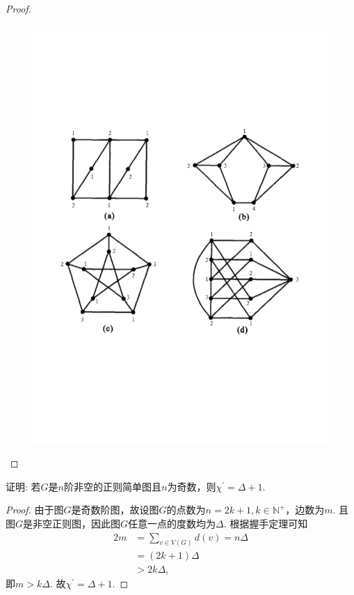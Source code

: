 \documentclass[cn,blue,normal,founder,11pt]{elegantnote}
\newcommand{\bbN}{\mathbb{N}}
\begin{document}
\begin{proof}
\begin{figure}[H]
	\caption{}
	\label{fig:7.1edge}
\end{figure}
\begin{figure}[H]
	\centering
	\includegraphics[scale=0.45]{image/ex7.1dot.pdf}
	\caption{}
	\label{fig:7.1dot}
\end{figure}
\end{proof}

\begin{example}
	证明: 若\(G\)是\(n\)阶非空的正则简单图且\(n\)为奇数，则\(\chi^{\prime}=\Delta+1\).
\end{example}

\begin{proof}
	由于图\(G\)是奇数阶图，故设图\(G\)的点数为\(n=2k+1,k\in\bbN^+\)，边数为\(m\). 且图\(G\)是非空正则图，因此图\(G\)任意一点的度数均为\(\Delta\). 根据握手定理可知
	\begin{align*}
		2m&=\sum_{v\in V(G)}d(v)=n\Delta\\
		&=(2k+1)\Delta\\
		&>2k\Delta,
	\end{align*}
	即\(m>k\Delta\). 故\(\chi^{\prime}=\Delta+1\).
\end{proof}
\end{document}
